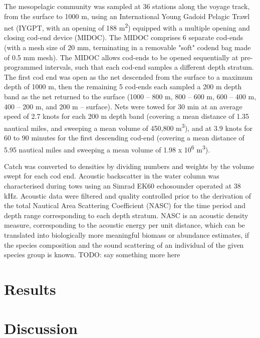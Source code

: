 \documentclass{article}
\begin{document}
The mesopelagic community was sampled at 36 stations along the voyage track, from the surface to 1000 m, using an International Young Gadoid Pelagic Trawl net (IYGPT, with an opening of 188 m\textsuperscript{2}) equipped with a multiple opening and closing cod-end device (MIDOC). 
The MIDOC comprises 6 separate cod-ends (with a mesh size of 20 mm, terminating in a removable "soft" codend bag made of 0.5 mm mesh). 
The MIDOC allows cod-ends to be opened sequentially at pre-programmed intervals, such that each cod-end samples a different depth stratum.
The first cod end was open as the net descended from the surface to a maximum depth of 1000 m, then the remaining 5 cod-ends each sampled a 200 m depth band as the net returned to the surface (1000 – 800 m, 800 – 600 m, 600 – 400 m, 400 – 200 m, and 200 m – surface).
Nets were towed for 30 min at an average speed of 2.7 knots for each 200 m depth band (covering a mean distance of 1.35 nautical miles, and sweeping a mean volume of 450,800 m\textsuperscript{3}), and at 3.9 knots for 60 to 90 minutes for the first descending cod-end (covering a mean distance of 5.95 nautical miles and sweeping a mean volume of 1.98 x 10\textsuperscript{6} m\textsuperscript{3}). 


Catch was converted to densities by dividing numbers and weights by the volume swept for each cod end. Acoustic backscatter in the water column was characterised during tows using an Simrad EK60 echosounder operated at 38 kHz.
Acoustic data were filtered and quality controlled prior to the derivation of the total Nautical Area Scattering Coefficient (NASC) for the time period and depth range corresponding to each depth stratum. NASC is an acoustic density measure, corresponding to the acoustic energy per unit distance, which can be translated into biologically more meaningful biomass or abundance estimates, if the species composition and the sound scattering of an individual of the given species group is known.
TODO: say something more here


\section{Results}



\section{Discussion}
\end{document}
